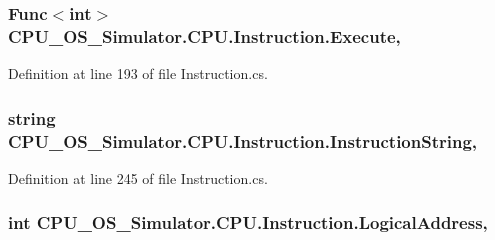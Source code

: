 \subsubsection[{Execute}]{\setlength{\rightskip}{0pt plus 5cm}Func$<$int$>$ C\+P\+U\+\_\+\+O\+S\+\_\+\+Simulator.\+C\+P\+U.\+Instruction.\+Execute\hspace{0.3cm}{\ttfamily [get]}, {\ttfamily [set]}}\label{class_c_p_u___o_s___simulator_1_1_c_p_u_1_1_instruction_afc4c52737c07181195a29413cf09d2a5}


Definition at line 193 of file Instruction.\+cs.

\hypertarget{class_c_p_u___o_s___simulator_1_1_c_p_u_1_1_instruction_a2750b111d827f6e6a8fccd0e8520de89}{}
\subsubsection[{Instruction\+String}]{\setlength{\rightskip}{0pt plus 5cm}string C\+P\+U\+\_\+\+O\+S\+\_\+\+Simulator.\+C\+P\+U.\+Instruction.\+Instruction\+String\hspace{0.3cm}{\ttfamily [get]}, {\ttfamily [set]}}\label{class_c_p_u___o_s___simulator_1_1_c_p_u_1_1_instruction_a2750b111d827f6e6a8fccd0e8520de89}


Definition at line 245 of file Instruction.\+cs.

\hypertarget{class_c_p_u___o_s___simulator_1_1_c_p_u_1_1_instruction_abfc23dbc9a978d2a1468b819f87a7614}{}
\subsubsection[{Logical\+Address}]{\setlength{\rightskip}{0pt plus 5cm}int C\+P\+U\+\_\+\+O\+S\+\_\+\+Simulator.\+C\+P\+U.\+Instruction.\+Logical\+Address\hspace{0.3cm}{\ttfamily [get]}, {\ttfamily [set]}}\label{class_c_p_u___o_s___simulator_1_1_c_p_u_1_1_instruction_abfc23dbc9a978d2a1468b819f87a7614}


